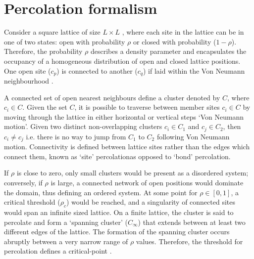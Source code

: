 \section{Percolation formalism}
\label{sec:perc-form}
Consider a square lattice of size $L \times L$ , where each site in the lattice can be in one of two states: %
open with probability $\rho$ or closed with probability ($1-\rho$). %
Therefore, the probability $\rho$ describes a density parameter and encapsulates the occupancy of a homogeneous distribution of open and closed lattice positions.
One open site ($c_p$) is connected to another ($c_q$) if laid within the Von Neumann neighbourhood \cite{toffoli1987cellular}.

A connected set of open nearest neighbours define a cluster denoted by $C$, where $c_i \in C$.
Given the set $C$, it is possible to traverse between member sites $c_i \in C$ by moving through the lattice in either horizontal or vertical steps `Von Neumann motion'. 
Given two distinct non-overlapping clusters $c_i \in C_1$ and $c_j \in C_2$, then $c_i \neq c_j $ i.e. there is no way to jump from $C_1$ to $C_2$ following Von Neumann motion. 
Connectivity is defined between lattice sites rather than the edges which connect them, known as `site' percolation\textemdash as opposed to `bond' percolation.

If $\rho$ is close to zero, only small clusters would be present as a disordered system; 
conversely, if $\rho$ is large, a connected network of open positions would dominate the domain, thus defining an ordered system.
At some point for $\rho \in [0, 1]$, a critical threshold ($\rho_c$) would be reached, and a singularity of connected sites would span an infinite sized lattice.
On a finite lattice, the cluster is said to percolate and form a `spanning cluster' ($C_\infty$) that extends between at least two different edges of the lattice.
The formation of the spanning cluster occurs abruptly between a very narrow range of $\rho$ values. 
Therefore, the threshold for percolation defines a critical-point \cite{STAUFFER19791}. 

